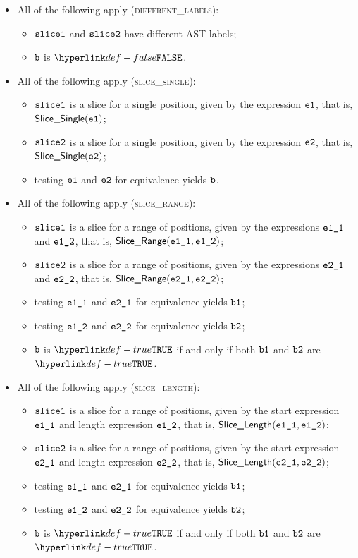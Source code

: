 \documentclass{book}
\newcommand\ProseOrTypeError[0]{\ProseTerminateAs{\TypeErrorConfig}}
\begin{document}
\begin{itemize}
  \item All of the following apply (\textsc{different\_labels}):
  \begin{itemize}
    \item $\texttt{slice1}$ and $\texttt{slice2}$ have different AST labels;
    \item $\texttt{b}$ is $\False$.
  \end{itemize}

  \item All of the following apply (\textsc{slice\_single}):
  \begin{itemize}
    \item $\texttt{slice1}$ is a slice for a single position, given by the expression $\texttt{e1}$, that is, $\textsf{Slice\_Single}(\texttt{e1})$;
    \item $\texttt{slice2}$ is a slice for a single position, given by the expression $\texttt{e2}$, that is, $\textsf{Slice\_Single}(\texttt{e2})$;
    \item testing $\texttt{e1}$ and $\texttt{e2}$ for equivalence yields $\texttt{b}$\ProseOrTypeError.
  \end{itemize}

  \item All of the following apply (\textsc{slice\_range}):
  \begin{itemize}
    \item $\texttt{slice1}$ is a slice for a range of positions, given by the expressions $\texttt{e1\_1}$ and $\texttt{e1\_2}$, that is, $\textsf{Slice\_Range}(\texttt{e1\_1}, \texttt{e1\_2})$;
    \item $\texttt{slice2}$ is a slice for a range of positions, given by the expressions $\texttt{e2\_1}$ and $\texttt{e2\_2}$, that is, $\textsf{Slice\_Range}(\texttt{e2\_1}, \texttt{e2\_2})$;
    \item testing $\texttt{e1\_1}$ and $\texttt{e2\_1}$ for equivalence yields $\texttt{b1}$\ProseOrTypeError;
    \item testing $\texttt{e1\_2}$ and $\texttt{e2\_2}$ for equivalence yields $\texttt{b2}$\ProseOrTypeError;
    \item $\texttt{b}$ is $\True$ if and only if both $\texttt{b1}$ and $\texttt{b2}$ are $\True$.
  \end{itemize}

  \item All of the following apply (\textsc{slice\_length}):
  \begin{itemize}
    \item $\texttt{slice1}$ is a slice for a range of positions, given by the start expression $\texttt{e1\_1}$ and length expression $\texttt{e1\_2}$, that is, $\textsf{Slice\_Length}(\texttt{e1\_1}, \texttt{e1\_2})$;
    \item $\texttt{slice2}$ is a slice for a range of positions, given by the start expression $\texttt{e2\_1}$ and length expression $\texttt{e2\_2}$, that is, $\textsf{Slice\_Length}(\texttt{e2\_1}, \texttt{e2\_2})$;
    \item testing $\texttt{e1\_1}$ and $\texttt{e2\_1}$ for equivalence yields $\texttt{b1}$\ProseOrTypeError;
    \item testing $\texttt{e1\_2}$ and $\texttt{e2\_2}$ for equivalence yields $\texttt{b2}$\ProseOrTypeError;
    \item $\texttt{b}$ is $\True$ if and only if both $\texttt{b1}$ and $\texttt{b2}$ are $\True$.
  \end{itemize}
\end{itemize}
\end{document}
